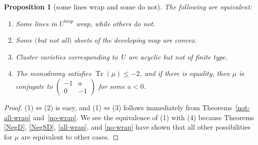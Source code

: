 \documentclass[11pt]{article}
\numberwithin{equation}{section}
\numberwithin{figure}{section}
\numberwithin{table}{section}
\DeclareMathOperator{\Tr}{Tr}
\DeclareMathOperator{\trop}{trop}
\newtheorem{prop}[thm]{Proposition}
\theoremstyle{definition}
\begin{document}
\begin{prop}[some lines wrap and some do not]\label{SomeWrap} The following are equivalent:
\begin{enumerate}\itemsep=0pt
\item[$1.$] Some {lines} in $U^{\trop}$ wrap, while others do not.
\item[$2.$] Some $($but not all$)$ sheets of the {developing map} are convex.
\item[$3.$] Cluster varieties corresponding to~$U$ are {acyclic} but not of {finite type}.
\item[$4.$] The {monodromy} satisfies $\Tr(\mu) \leq -2$, and if there is equality, then $\mu$ is conjugate to $
	\left(\begin{smallmatrix}
		-1 &a \\
		0 &-1
		\end{smallmatrix}\right)$ for some $a<0$.
\end{enumerate}
\end{prop}
\begin{proof}(1)$\Leftrightarrow$(2) is easy, and (1)$\Leftrightarrow$(3) follows immediately from Theorems~\ref{not-all-wrap} and~\ref{no-wrap}. We see the equivalence of (1) with (4) because Theorems \ref{NegD}, \ref{NegSD}, \ref{all-wrap}, and \ref{no-wrap} have shown that all other possibilities for $\mu$ are equivalent to other cases.
\end{proof}
\end{document}
